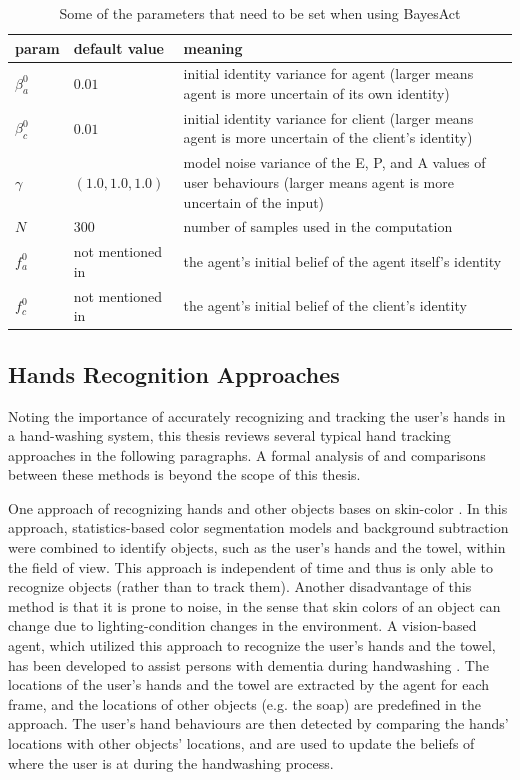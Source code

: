 \begin{table}
\centering
\caption{Some of the parameters that need to be set when using BayesAct}
\label{table:bayesact-param}
\begin{tabular}{| l | l | p{9.4cm} |}
\hline
param & default value & meaning \\ \hline
$\beta_{a}^{0}$ & $0.01$ & initial identity variance for agent (larger means agent is more uncertain of its own identity) \\ \hline
$\beta_{c}^{0}$ & $0.01$ & initial identity variance for client (larger means agent is more uncertain of the client's identity) \\ \hline
$\gamma$ & $(1.0, 1.0, 1.0)$ & model noise variance of the E, P, and A values of user behaviours (larger means agent is more uncertain of the input) \\ \hline
$N$ & $300$ & number of samples used in the computation \\ \hline
$f_a^{0}$ & not mentioned in \cite{hoey2013bayesian} & the agent's initial belief of the agent itself's identity \\ \hline
$f_c^{0}$ & not mentioned in \cite{hoey2013bayesian} & the agent's initial belief of the client's identity \\ \hline
\end{tabular}
\end{table}

\subsection{Hands Recognition Approaches}

Noting the importance of accurately recognizing and tracking the user's hands in a hand-washing system, this thesis reviews several typical hand tracking approaches in the following paragraphs. A formal analysis of and comparisons between these methods is beyond the scope of this thesis.

One approach of recognizing hands and other objects bases on skin-color \cite{mihailidis2004use}. In this approach, statistics-based color segmentation models and background subtraction were combined to identify objects, such as the user's hands and the towel, within the field of view. This approach is independent of time and thus is only able to recognize objects (rather than to track them). Another disadvantage of this method is that it is prone to noise, in the sense that skin colors of an object can change due to lighting-condition changes in the environment. A vision-based agent, which utilized this approach to recognize the user's hands and the towel, has been developed to assist persons with dementia during handwashing \cite{boger2005decision}. The locations of the user's hands and the towel are extracted by the agent for each frame, and the locations of other objects (e.g. the soap) are predefined in the approach. The user's hand behaviours are then detected by comparing the hands' locations with other objects' locations, and are used to update the beliefs of where the user is at during the handwashing process. 

